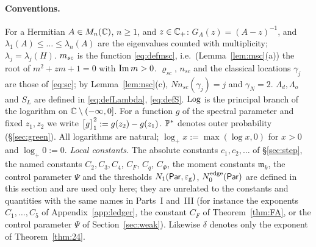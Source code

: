 \paragraph{Conventions.} For a Hermitian $A\in M_n(\C)$, $n\ge1$, and $z\in\C_+$: $G_A(z)=(A-z)^{-1}$, and $\lambda_1(A)\le\dots\le\lambda_n(A)$
are the eigenvalues counted with multiplicity; $\lambda_j=\lambda_j(H)$. $\msc$ is the function \eqref{eq:defmsc}, i.e.\ (Lemma~\ref{lem:msc}(a))
the root of $m^2+zm+1=0$ with $\im m>0$. $\varrho_{sc}$, $n_{sc}$ and the classical locations $\gamma_j$ are those of \eqref{eq:sc}; by
Lemma~\ref{lem:nsc}(c), $Nn_{sc}(\gamma_j)=j$ and $\gamma_N=2$. $\Lambda_d,\Lambda_o$ and $S_L$ are defined in \eqref{eq:defLambda}, \eqref{eq:defS}.
$\Log$ is the principal branch of the logarithm on $\C\setminus(-\infty,0]$. For a function $g$ of the spectral parameter and fixed
$z_1,z_2$ we write $\br{g}:=g(z_2)-g(z_1)$. $\P^*$ denotes outer probability (\S\ref{sec:green}). All logarithms are natural; $\log_+x:=\max(\log x,0)$ for $x>0$ and $\log_+0:=0$.
\emph{Local constants.} The absolute constants $c_1,c_2,\dots$ of \S\ref{sec:step}, the named constants $C_2,C_3,C_4$, $C_F$, $C_q$, $C_\Phi$, the moment constants $\mathfrak m_k$, the control parameter $\Psi$ and the thresholds $N_1(\Par,\eg)$, $N_0^{\rm edge}(\Par)$
are defined in this section and are used only here; they are unrelated to the constants and quantities with the same names in Parts~I and~III (for instance the exponents $C_1,\dots,C_5$ of Appendix~\ref{app:ledger},
the constant $C_F$ of Theorem~\ref{thm:FA}, or the control parameter $\Psi$ of Section~\ref{sec:weak}).
Likewise $\delta$ denotes only the exponent of Theorem~\ref{thm:24}.

